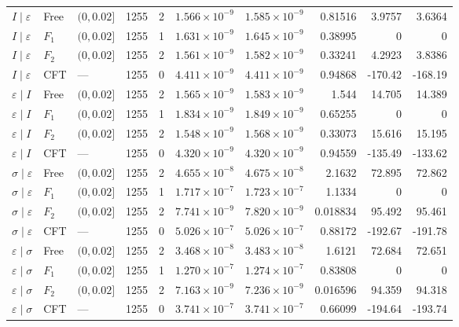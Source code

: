 \begin{longtable}{lllrrrrrrr}
\midrule
$I\mid \varepsilon$ & Free & $(0,0.02]$ & 1255 & 2 & $1.566\!\times\!10^{-9}$ & $1.585\!\times\!10^{-9}$ & 0.81516 & 3.9757 & 3.6364\\*
$I\mid \varepsilon$ & $F_1$ & $(0,0.02]$ & 1255 & 1 & $1.631\!\times\!10^{-9}$ & $1.645\!\times\!10^{-9}$ & 0.38995 & 0 & 0\\*
$I\mid \varepsilon$ & $F_2$ & $(0,0.02]$ & 1255 & 2 & $1.561\!\times\!10^{-9}$ & $1.582\!\times\!10^{-9}$ & 0.33241 & 4.2923 & 3.8386\\*
$I\mid \varepsilon$ & CFT & --- & 1255 & 0 & $4.411\!\times\!10^{-9}$ & $4.411\!\times\!10^{-9}$ & 0.94868 & -170.42 & -168.19\\
\midrule
$\varepsilon\mid I$ & Free & $(0,0.02]$ & 1255 & 2 & $1.565\!\times\!10^{-9}$ & $1.583\!\times\!10^{-9}$ & 1.544 & 14.705 & 14.389\\*
$\varepsilon\mid I$ & $F_1$ & $(0,0.02]$ & 1255 & 1 & $1.834\!\times\!10^{-9}$ & $1.849\!\times\!10^{-9}$ & 0.65255 & 0 & 0\\*
$\varepsilon\mid I$ & $F_2$ & $(0,0.02]$ & 1255 & 2 & $1.548\!\times\!10^{-9}$ & $1.568\!\times\!10^{-9}$ & 0.33073 & 15.616 & 15.195\\*
$\varepsilon\mid I$ & CFT & --- & 1255 & 0 & $4.320\!\times\!10^{-9}$ & $4.320\!\times\!10^{-9}$ & 0.94559 & -135.49 & -133.62\\
\midrule
$\sigma\mid \varepsilon$ & Free & $(0,0.02]$ & 1255 & 2 & $4.655\!\times\!10^{-8}$ & $4.675\!\times\!10^{-8}$ & 2.1632 & 72.895 & 72.862\\*
$\sigma\mid \varepsilon$ & $F_1$ & $(0,0.02]$ & 1255 & 1 & $1.717\!\times\!10^{-7}$ & $1.723\!\times\!10^{-7}$ & 1.1334 & 0 & 0\\*
$\sigma\mid \varepsilon$ & $F_2$ & $(0,0.02]$ & 1255 & 2 & $7.741\!\times\!10^{-9}$ & $7.820\!\times\!10^{-9}$ & 0.018834 & 95.492 & 95.461\\*
$\sigma\mid \varepsilon$ & CFT & --- & 1255 & 0 & $5.026\!\times\!10^{-7}$ & $5.026\!\times\!10^{-7}$ & 0.88172 & -192.67 & -191.78\\
\midrule
$\varepsilon\mid \sigma$ & Free & $(0,0.02]$ & 1255 & 2 & $3.468\!\times\!10^{-8}$ & $3.483\!\times\!10^{-8}$ & 1.6121 & 72.684 & 72.651\\*
$\varepsilon\mid \sigma$ & $F_1$ & $(0,0.02]$ & 1255 & 1 & $1.270\!\times\!10^{-7}$ & $1.274\!\times\!10^{-7}$ & 0.83808 & 0 & 0\\*
$\varepsilon\mid \sigma$ & $F_2$ & $(0,0.02]$ & 1255 & 2 & $7.163\!\times\!10^{-9}$ & $7.236\!\times\!10^{-9}$ & 0.016596 & 94.359 & 94.318\\*
$\varepsilon\mid \sigma$ & CFT & --- & 1255 & 0 & $3.741\!\times\!10^{-7}$ & $3.741\!\times\!10^{-7}$ & 0.66099 & -194.64 & -193.74\\
\end{longtable}
\endgroup
